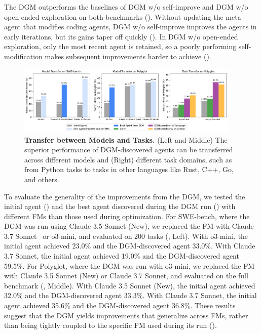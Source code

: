 \documentclass{article}
\begin{document}
The DGM outperforms the baselines of DGM w/o self-improve and DGM w/o open-ended exploration on both benchmarks (). Without updating the meta agent that modifies coding agents, DGM w/o self-improve improves the agents in early iterations, but its gains taper off quickly (). In DGM w/o open-ended exploration, only the most recent agent is retained, so a poorly performing self-modification makes subsequent improvements harder to achieve ().

\begin{figure}[ht]
    \centering
    \includegraphics[width=0.95\textwidth]{figures/transfer_model_task.pdf}
    \caption{\textbf{Transfer between Models and Tasks.} (Left and Middle) The superior performance of DGM-discovered agents can be transferred across different models and (Right) different task domains, such as from Python tasks to tasks in other languages like Rust, C++, Go, and others.}
    \label{fig:transfer-overview}
    \vspace{-0.2cm}
\end{figure}
        
To evaluate the generality of the improvements from the DGM, we tested the initial agent () and the best agent discovered during the DGM run () with different FMs than those used during optimization. For SWE-bench, where the DGM was run using Claude 3.5 Sonnet (New), we replaced the FM with Claude 3.7 Sonnet~\citep{anthropic2025claude37} or o3-mini, and evaluated on 200 tasks (, Left). With o3-mini, the initial agent achieved 23.0\% and the DGM-discovered agent 33.0\%. With Claude 3.7 Sonnet, the initial agent achieved 19.0\% and the DGM-discovered agent 59.5\%. For Polyglot, where the DGM was run with o3-mini, we replaced the FM with Claude 3.5 Sonnet (New) or Claude 3.7 Sonnet, and evaluated on the full benchmark (, Middle). With Claude 3.5 Sonnet (New), the initial agent achieved 32.0\% and the DGM-discovered agent 33.3\%. With Claude 3.7 Sonnet, the initial agent achieved 35.6\% and the DGM-discovered agent 36.8\%. These results suggest that the DGM yields improvements that generalize across FMs, rather than being tightly coupled to the specific FM used during its run ().
\end{document}

